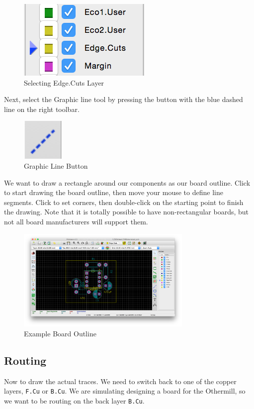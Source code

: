\documentclass[12pt, oneside]{article}
\begin{document}
\begin{figure}[H]
\includegraphics{BorderSelection}
\centering
\caption{Selecting Edge.Cuts Layer}
\end{figure}

Next, select the Graphic line tool by pressing the button with the blue dashed line on the right toolbar.

\begin{figure}[H]
\includegraphics{GraphicLineButton}
\centering
\caption{Graphic Line Button}
\end{figure}

We want to draw a rectangle around our components as our board outline. Click to start drawing the board outline, then move your mouse to define line segments. Click to set corners, then double-click on the starting point to finish the drawing. Note that it is totally possible to have non-rectangular boards, but not all board manufacturers will support them.

\begin{figure}[H]
\includegraphics[width=0.75\textwidth]{BoardOutline}
\centering
\caption{Example Board Outline}
\end{figure}

\subsection{Routing}
Now to draw the actual traces. We need to switch back to one of the copper layers, \texttt{F.Cu} or \texttt{B.Cu}. We are simulating designing a board for the Othermill, so we want to be routing on the back layer \texttt{B.Cu}. 
\end{document}
